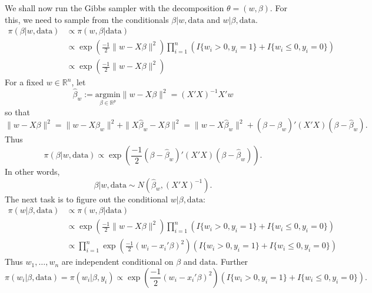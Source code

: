 \documentclass{scrartcl}
\newcommand{\R}{{\mathbb R}}
\newcommand{\data}{{\text{data}}}
\begin{document}
  We shall now run the Gibbs sampler with the decomposition $\theta =
  (w, \beta)$. For this, we need to sample from the conditionals
  $\beta|w, \text{data}$ and $w | \beta, \text{data}$.
  \begin{align*}
    \pi(\beta | w, \text{data}) &\propto \pi(w, \beta | \text{data})
    \\
&\propto \exp \left(\frac{-1}{2} \|w - X \beta\|^2 \right)  \prod_{i=1}^n \left(I\{w_i > 0, y_i = 1\} +
      I\{w_i \leq 0, y_i = 0\} \right) \\
&\propto \exp \left(\frac{-1}{2} \|w - X \beta\|^2 \right) 
  \end{align*}
For a fixed $w \in \R^n$, let 
\begin{equation*}
   \hat{\beta}_w  := \underset{\beta \in \R^p}{\text{argmin}} \|w - X
   \beta\|^2 = (X' X)^{-1} X' w 
\end{equation*}
so that
\begin{equation*}
  \|w - X \beta\|^2 = \|w - X \hat{\beta}_w\|^2 + \|X \hat{\beta}_w -
  X \beta\|^2 = \|w - X \hat{\beta}_w\|^2 + \left(\beta -
    \hat{\beta}_w \right)' (X' X) \left(\beta -
    \hat{\beta}_w \right). 
\end{equation*}
Thus
\begin{equation*}
  \pi(\beta | w, \text{data}) \propto \exp \left(\frac{-1}{2} \left(\beta -
    \hat{\beta}_w \right)' (X' X) \left(\beta -
    \hat{\beta}_w \right) \right). 
\end{equation*}
In other words,
\begin{equation*}
  \beta|w, \text{data} \sim N \left(\hat{\beta}_w, (X' X)^{-1}
  \right). 
\end{equation*}
The next task is to figure out the conditional $w | \beta, \data$:
  \begin{align*}
    \pi(w | \beta, \text{data}) &\propto \pi(w, \beta | \text{data})
    \\
&\propto \exp \left(\frac{-1}{2} \|w - X \beta\|^2 \right)  \prod_{i=1}^n \left(I\{w_i > 0, y_i = 1\} +
         I\{w_i \leq 0, y_i = 0\} \right) \\
& \propto \prod_{i=1}^n \exp \left(\frac{-1}{2} (w_i - x_i' \beta)^2
                                               \right) \left(I\{w_i > 0, y_i = 1\} +
         I\{w_i \leq 0, y_i = 0\} \right)
  \end{align*}
Thus $w_1, \dots, w_n$ are independent conditional on $\beta$ and
$\data$. Further
\begin{equation*}
  \pi(w_i|\beta, \data) = \pi(w_i | \beta, y_i) \propto \exp \left(\frac{-1}{2} (w_i - x_i' \beta)^2
                                               \right) \left(I\{w_i > 0, y_i = 1\} +
         I\{w_i \leq 0, y_i = 0\} \right). 
     \end{equation*}
\end{document}
